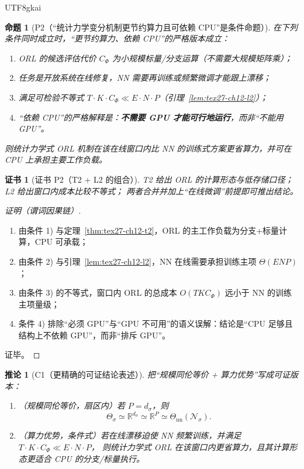 \documentclass[12pt]{article}
\newtheorem{proposition}{命题}[section]
\newtheorem{corollary}{推论}[section]
\newtheorem{Certificate}{证书}[section]
\newcommand{\RR}{\mathbb{R}}
\begin{document}
\begin{CJK*}{UTF8}{gkai}
\begin{proposition}[P2（“统计力学变分机制更节约算力且可依赖 CPU”是条件命题）]
\label{prop:tex27-ch12-p2}
在下列条件同时成立时，“更节约算力、依赖 CPU”的严格版本成立：
\begin{enumerate}
  \item ORL 的候选评估代价 $C_\Phi$ 为小规模标量/分支运算（不需要大规模矩阵乘）；
  \item 任务是开放系统在线修复，NN 需要再训练或频繁微调才能跟上漂移；
  \item 满足可检验不等式 $T\cdot K\cdot C_\Phi\ll E\cdot N\cdot P$（引理~\ref{lem:tex27-ch12-l2}）；
  \item “依赖 CPU”的严格解释是：\textbf{不需要 GPU 才能可行地运行}，而非“不能用 GPU”。
\end{enumerate}
则统计力学式 ORL 机制在该在线窗口内比 NN 的训练式方案更省算力，并可在 CPU 上承担主要工作负载。
\end{proposition}

\begin{Certificate}[证书 P2（T2 + L2 的组合）]
\label{cert:tex27-ch12-p2}
T2 给出 ORL 的计算形态与低存储口径；L2 给出窗口内成本比较不等式；
两者合并并加上“在线微调”前提即可推出结论。
\end{Certificate}

\begin{proof}[证明（谓词因果链）]
\begin{enumerate}
  \item 由条件 1) 与定理~\ref{thm:tex27-ch12-t2}，ORL 的主工作负载为分支+标量计算，CPU 可承载；
  \item 由条件 2) 与引理~\ref{lem:tex27-ch12-l2}，NN 在线需要承担训练主项 $\Theta(ENP)$；
  \item 由条件 3) 的不等式，窗口内 ORL 的总成本 $O(TKC_\Phi)$ 远小于 NN 的训练主项量级；
  \item 条件 4) 排除“必须 GPU”与“GPU 不可用”的语义误解：结论是“CPU 足够且结构上不依赖 GPU”，而非“排斥 GPU”。
\end{enumerate}
证毕。
\end{proof}

\begin{corollary}[C1（更精确的可证结论表述）]
\label{cor:tex27-ch12-c1}
把“规模同伦等价 + 算力优势”写成可证版本：
\begin{enumerate}
  \item（规模同伦等价，扇区内）若 $P=d_\sigma$，则
  \[
    \Theta_\sigma \simeq \RR^{d_\sigma}\simeq \RR^{P}\simeq \Theta_{\mathrm{nn}}(\mathcal{N}_\sigma).
  \]
  \item（算力优势，条件式）若在线漂移迫使 NN 频繁训练，并满足 $T\cdot K\cdot C_\Phi\ll E\cdot N\cdot P$，
  则统计力学式 ORL 在该窗口内更省算力，且其计算形态更适合 CPU 的分支/标量执行。
\end{enumerate}
\end{corollary}


\end{CJK*}
\end{document}
